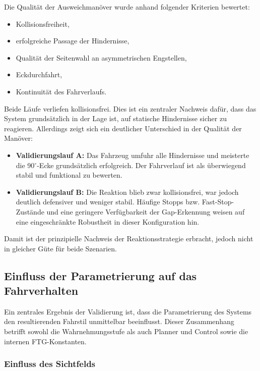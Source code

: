 Die Qualität der Ausweichmanöver wurde anhand folgender Kriterien bewertet:

\begin{itemize}
    \item Kollisionsfreiheit,
    \item erfolgreiche Passage der Hindernisse,
    \item Qualität der Seitenwahl an asymmetrischen Engstellen,
    \item Eckdurchfahrt,
    \item Kontinuität des Fahrverlaufs.
\end{itemize}

Beide Läufe verliefen kollisionsfrei. Dies ist ein zentraler Nachweis dafür, dass das System grundsätzlich in der Lage ist, auf statische Hindernisse sicher zu reagieren. Allerdings zeigt sich ein deutlicher Unterschied in der Qualität der Manöver:

\begin{itemize}
    \item \textbf{Validierungslauf A:} Das Fahrzeug umfuhr alle Hindernisse und meisterte die 90$^\circ$-Ecke grundsätzlich erfolgreich. Der Fahrverlauf ist als überwiegend stabil und funktional zu bewerten.
    \item \textbf{Validierungslauf B:} Die Reaktion blieb zwar kollisionsfrei, war jedoch deutlich defensiver und weniger stabil. Häufige Stopps bzw. Fast-Stop-Zustände und eine geringere Verfügbarkeit der Gap-Erkennung weisen auf eine eingeschränkte Robustheit in dieser Konfiguration hin.
\end{itemize}

Damit ist der prinzipielle Nachweis der Reaktionsstrategie erbracht, jedoch nicht in gleicher Güte für beide Szenarien.

\subsection{Einfluss der Parametrierung auf das Fahrverhalten}

Ein zentrales Ergebnis der Validierung ist, dass die Parametrierung des Systems den resultierenden Fahrstil unmittelbar beeinflusst. Dieser Zusammenhang betrifft sowohl die Wahrnehmungsstufe als auch Planner und Control sowie die internen FTG-Konstanten.

\subsubsection*{Einfluss des Sichtfelds}

